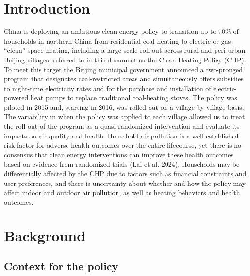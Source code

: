 \documentclass[
  letterpaper,
  DIV=11,
  numbers=noendperiod]{scrartcl}
\begin{document}
\newpage

\section{Introduction}\label{introduction-1}

China is deploying an ambitious clean energy policy to transition up to
70\% of households in northern China from residential coal heating to
electric or gas ``clean'' space heating, including a large-scale roll
out across rural and peri-urban Beijing villages, referred to in this
document as the Clean Heating Policy (CHP). To meet this target the
Beijing municipal government announced a two-pronged program that
designates coal-restricted areas and simultaneously offers subsidies to
night-time electricity rates and for the purchase and installation of
electric-powered heat pumps to replace traditional coal-heating stoves.
The policy was piloted in 2015 and, starting in 2016, was rolled out on
a village-by-village basis. The variability in when the policy was
applied to each village allowed us to treat the roll-out of the program
as a quasi-randomized intervention and evaluate its impacts on air
quality and health. Household air pollution is a well-established risk
factor for adverse health outcomes over the entire lifecourse, yet there
is no consensus that clean energy interventions can improve these health
outcomes based on evidence from randomized trials (Lai et al. 2024).
Households may be differentially affected by the CHP due to factors such
as financial constraints and user preferences, and there is uncertainty
about whether and how the policy may affect indoor and outdoor air
pollution, as well as heating behaviors and health outcomes.

\section{Background}\label{background}

\subsection{Context for the policy}\label{context-for-the-policy}
\end{document}
